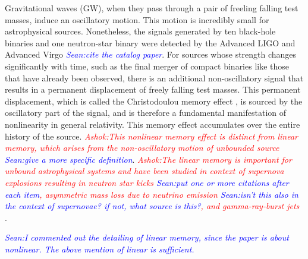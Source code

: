 \documentclass[twocolumn,showpacs,aps,prd,nobibnotes,floatfix]{revtex4-1}
\newcommand{\ashok}[1]{\textcolor{red}{\textit{Ashok:#1}}}
\newcommand{\stm}[1]{\textcolor{blue}{\textit{Sean:#1}}}
\begin{document}
Gravitational waves (GW), when they pass through a pair of freeling falling test masses, induce an oscillatory motion. This motion is incredibly small for astrophysical sources. Nonetheless, the signals generated by ten black-hole binaries and one neutron-star binary were detected by the Advanced LIGO and Advanced Virgo\cite{Ligocatalog2018} \stm{cite the catalog paper}. For sources whose strength changes significantly with time, such as the final merger of compact binaries like those that have already been observed, there is an additional non-oscillatory signal that results in a permanent displacement of
freely falling test masses. This permanent displacement, which is called the Christodoulou memory effect \cite{Christodoulou1991}, is sourced by the oscillatory part of the signal, and is therefore a fundamental manifestation of nonlinearity in general relativity. This memory effect accumulates over the entire history of the source. \ashok{This nonlinear memory effect is distinct from linear memory, which arises from the non-oscillatory motion of unbounded source} \stm{give a more specific definition}. \ashok{The linear memory is important for unbound astrophysical systems and have been studied in context of supernova explosions resulting in neutron star kicks \cite{Burrows1996}\cite{Muller2004}\stm{put one or more citations after each item}, asymmetric mass loss due to neutrino emission \cite{COtt2009} \stm{isn't this also in the context of supernovae? if not, what source is this?}, and gamma-ray-burst jets \cite{Davies_Melvyn2002,Buonanno_Sigl2015,Kotake_Kei2009}}. 

\stm{I commented out the detailing of linear memory, since the paper is about nonlinear. The above mention of linear is sufficient.}
\end{document}
